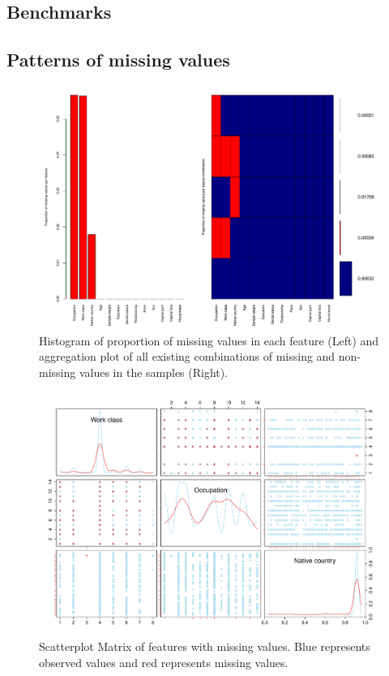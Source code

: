 \documentclass[12pt]{article}
\begin{document}
\subsection{Benchmarks}

\subsection{Patterns of missing values}

\begin{figure}[htbp] 
   \centering
   \includegraphics[scale=0.6]{proportion-missing.pdf} 
   \caption{Histogram of proportion of missing values in each feature (Left) and aggregation plot of all existing combinations of missing and non-missing values in the samples (Right).}
   \label{proportion-missing}
\end{figure}

\begin{figure}[htbp] 
   \centering
   \includegraphics[scale=0.6]{scatter-matrix-missing.pdf} 
   \caption{Scatterplot Matrix of features with missing values. Blue represents observed values and red represents missing values.}
   \label{proportion-missing}
\end{figure}
\end{document}
